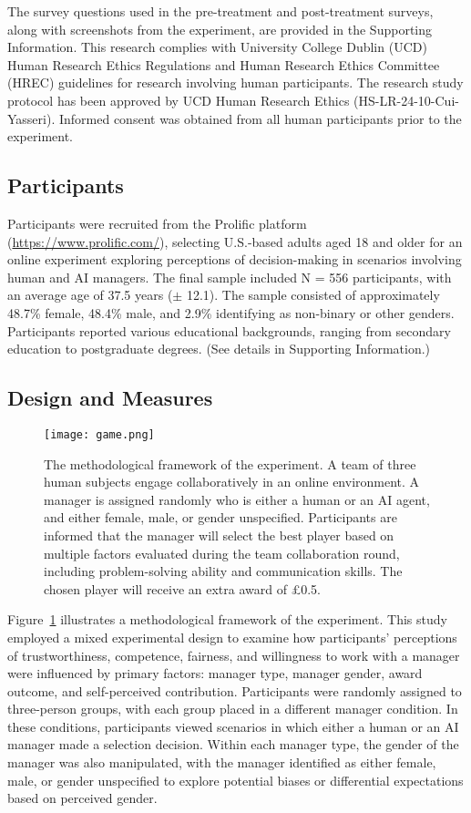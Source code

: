 \documentclass{article}
\begin{document}
{The survey questions used in the pre-treatment and post-treatment surveys, along with screenshots from the experiment, are provided in the Supporting Information.
This research complies with University College Dublin (UCD) Human Research Ethics Regulations and Human Research Ethics Committee (HREC) guidelines for research involving human participants. The research study protocol has been approved by UCD Human Research Ethics
(HS-LR-24-10-Cui-Yasseri). Informed consent was obtained from all human participants prior to the experiment.


\subsection*{Participants}
Participants were recruited from the Prolific platform (\url{https://www.prolific.com/}), selecting U.S.-based adults aged 18 and older for an online experiment exploring perceptions of decision-making in scenarios involving human and AI managers. The final sample included N = 556 participants, with an average age of 37.5 years ($\pm$ 12.1). The sample consisted of approximately 48.7\% female, 48.4\% male, and 2.9\% identifying as non-binary or other genders. Participants reported various educational backgrounds, ranging from secondary education to postgraduate degrees. (See details in Supporting Information.) 

\subsection*{Design and Measures}

\begin{figure}[htbp] 
    \centering
    \texttt{[image: game.png]} 
    \caption{The methodological framework of the experiment. A team of three human subjects engage collaboratively in an online environment. A manager is assigned randomly who is either a human or an AI agent, and either female, male, or gender unspecified. 
    Participants are informed that the manager will select the best player based on multiple factors evaluated during the team collaboration round, including problem-solving ability and communication skills. The chosen player will receive an extra award of \pounds0.5. 
    }
    \label{fig:fig_game} 
\end{figure}

Figure~\ref{fig:fig_game} illustrates a methodological framework of the experiment.
This study employed a mixed experimental design to examine how participants’ perceptions of trustworthiness, competence, fairness, and willingness to work with a manager were influenced by primary factors: manager type, manager gender, award outcome, and self-perceived contribution. Participants were randomly assigned to three-person groups, with each group placed in a different manager condition. In these conditions, participants viewed scenarios in which either a human or an AI manager made a selection decision. Within each manager type, the gender of the manager was also manipulated, with the manager identified as either female, male, or gender unspecified to explore potential biases or differential expectations based on perceived gender. 

}
\end{document}
